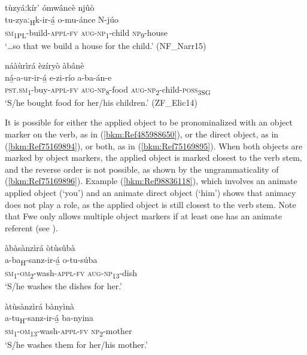 \ea
\label{bkm:Ref445887382}
tùzyáːkír’ ómwâncè njûò\\
\gll tu-zyaː\textsubscript{H}k-ir-á̲    o-mu-ánce    N-júo\\
\textsc{sm}\textsubscript{1PL}-build-\textsc{appl}-\textsc{fv}  \textsc{aug}-\textsc{np}\textsubscript{1}-child  \textsc{np}\textsubscript{9}-house\\
\glt ‘…so that we build a house for the child.’ (NF\_Narr15)
\z

\ea
\label{bkm:Ref461182140}
náàùrìrá èzíryò àbânè\\
\gll ná̲-a-ur-ir-á̲      e-zi-río    a-ba-án-e\\
\textsc{pst}.\textsc{sm}\textsubscript{1}-buy-\textsc{appl}-\textsc{fv}  \textsc{aug}-\textsc{np}\textsubscript{8}-food  \textsc{aug}-\textsc{np}\textsubscript{2}-child-\textsc{poss}\textsubscript{3SG}\\
\glt ‘S/he bought food for her/his children.’ (ZF\_Elic14)
\z

It is possible for either the applied object to be pronominalized with an object marker on the verb, as in (\ref{bkm:Ref485988650}), or the direct object, as in (\ref{bkm:Ref75169894}), or both, as in (\ref{bkm:Ref75169895}). When both objects are marked by object markers, the applied object is marked closest to the verb stem, and the reverse order is not possible, as shown by the ungrammaticality of (\ref{bkm:Ref75169896}). Example (\ref{bkm:Ref98836118}), which involves an animate applied object (‘you’) and an animate direct object (‘him’) shows that animacy does not play a role, as the applied object is still closest to the verb stem. Note that Fwe only allows multiple object markers if at least one has an animate referent (see ).

\ea
\label{bkm:Ref485988650}
àbàsànzìrá òtùsûbà\\
\gll a-ba\textsubscript{H}-sanz-ir-á̲    o-tu-súba\\
\textsc{sm}\textsubscript{1}-\textsc{om}\textsubscript{2}-wash-\textsc{appl}-\textsc{fv}  \textsc{aug}-\textsc{np}\textsubscript{13}-dish\\
\glt ‘S/he washes the dishes for her.’
\z

\ea
\label{bkm:Ref75169894}
àtùsànzìrá bànyìnà\\
\gll a-tu\textsubscript{H}-sanz-ir-á̲    ba-nyina\\
\textsc{sm}\textsubscript{1}-\textsc{om}\textsubscript{13}-wash-\textsc{appl}-\textsc{fv}  \textsc{np}\textsubscript{2}-mother\\
\glt ‘S/he washes them for her/his mother.’
\z

